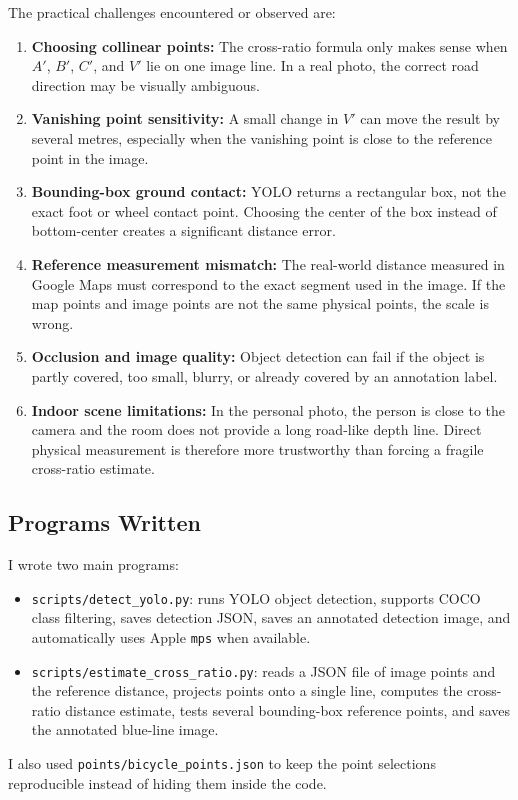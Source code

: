 \documentclass[11pt]{article}
\begin{document}
The practical challenges encountered or observed are:
\begin{enumerate}
    \item \textbf{Choosing collinear points:} The cross-ratio formula only makes sense when \(A'\), \(B'\), \(C'\), and \(V'\) lie on one image line. In a real photo, the correct road direction may be visually ambiguous.
    \item \textbf{Vanishing point sensitivity:} A small change in \(V'\) can move the result by several metres, especially when the vanishing point is close to the reference point in the image.
    \item \textbf{Bounding-box ground contact:} YOLO returns a rectangular box, not the exact foot or wheel contact point. Choosing the center of the box instead of bottom-center creates a significant distance error.
    \item \textbf{Reference measurement mismatch:} The real-world distance measured in Google Maps must correspond to the exact segment used in the image. If the map points and image points are not the same physical points, the scale is wrong.
    \item \textbf{Occlusion and image quality:} Object detection can fail if the object is partly covered, too small, blurry, or already covered by an annotation label.
    \item \textbf{Indoor scene limitations:} In the personal photo, the person is close to the camera and the room does not provide a long road-like depth line. Direct physical measurement is therefore more trustworthy than forcing a fragile cross-ratio estimate.
\end{enumerate}

\subsection{Programs Written}

I wrote two main programs:
\begin{itemize}
    \item \texttt{scripts/detect\_yolo.py}: runs YOLO object detection, supports COCO class filtering, saves detection JSON, saves an annotated detection image, and automatically uses Apple \texttt{mps} when available.
    \item \texttt{scripts/estimate\_cross\_ratio.py}: reads a JSON file of image points and the reference distance, projects points onto a single line, computes the cross-ratio distance estimate, tests several bounding-box reference points, and saves the annotated blue-line image.
\end{itemize}

I also used \texttt{points/bicycle\_points.json} to keep the point selections reproducible instead of hiding them inside the code.
\end{document}
